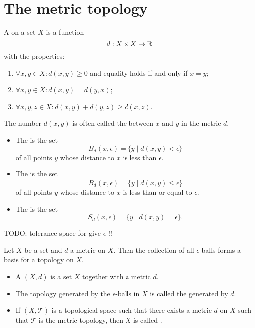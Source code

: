 \section{The metric topology}
\begin{definition}
A  on a set $X$ is a function
\[ d:X\times X \to \mathbb{R} \]
with the properties:
\begin{enumerate}
\item $\forall x,y\in X: d(x,y)\geq 0$ and equality holds \textup{if and only if} $x=y$;
\item $\forall x,y\in X: d(x,y)= d(y,x)$;
\item $\forall x,y,z\in X: d(x,y)+d(y,z)\geq d(x,z)$.
\end{enumerate}
\end{definition}
The number $d(x,y)$ is often called the  between $x$ and $y$ in the metric $d$.
\begin{definition}
\begin{itemize}
\item The  is the set
\[ B_d(x,\epsilon) = \{y\;|\; d(x,y)< \epsilon\} \]
of all points $y$ whose distance to $x$ is less than $\epsilon$.
\item The  is the set
\[ \overline{B}_d(x,\epsilon) = \{y\;|\; d(x,y)\leq \epsilon\} \]
of all points $y$ whose distance to $x$ is less than or equal to $\epsilon$.
\item The  is the set
\[ S_d(x,\epsilon) = \{y\;|\; d(x,y) = \epsilon\}. \]
\end{itemize}
\end{definition}

TODO: tolerance space for give $\epsilon$ !!

\begin{lemma}
Let $X$ be a set and $d$ a metric on $X$. Then the collection of all $\epsilon$-balls forms a basis for a topology on $X$.
\end{lemma}

\begin{definition}
\begin{itemize}
\item A  $(X,d)$ is a set $X$ together with a metric $d$.
\item The topology generated by the $\epsilon$-balls in $X$ is called the  generated by $d$.
\item If $(X,\mathcal{T})$ is a topological space such that there exists a metric $d$ on $X$ such that $\mathcal{T}$ is the metric topology, then $X$ is called .
\end{itemize}
\end{definition}

